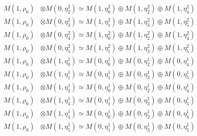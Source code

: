 \begin{align*}
M(1,\rho_{0}) &\otimes M(0,\eta^{2}_{2}) \simeq M(1,\eta^{2}_{0}) \oplus M(1,\eta^{2}_{2}) \oplus M(1,\eta^{2}_{4}) \\
M(1,\rho_{0}) &\otimes M(0,\eta^{2}_{3}) \simeq M(1,\eta^{2}_{1}) \oplus M(1,\eta^{2}_{3}) \oplus M(1,\eta^{2}_{5}) \\
M(1,\rho_{0}) &\otimes M(0,\eta^{2}_{4}) \simeq M(1,\eta^{2}_{0}) \oplus M(1,\eta^{2}_{2}) \oplus M(1,\eta^{2}_{4}) \\
M(1,\rho_{0}) &\otimes M(0,\eta^{2}_{5}) \simeq M(1,\eta^{2}_{1}) \oplus M(1,\eta^{2}_{3}) \oplus M(1,\eta^{2}_{5}) \\
M(1,\rho_{0}) &\otimes M(1,\eta^{1}_{0}) \simeq M(0,\eta^{1}_{0}) \oplus M(0,\eta^{1}_{2}) \oplus M(0,\eta^{1}_{4}) \\
M(1,\rho_{0}) &\otimes M(1,\eta^{1}_{1}) \simeq M(0,\eta^{1}_{1}) \oplus M(0,\eta^{1}_{3}) \oplus M(0,\eta^{1}_{5}) \\
M(1,\rho_{0}) &\otimes M(1,\eta^{1}_{2}) \simeq M(0,\eta^{1}_{0}) \oplus M(0,\eta^{1}_{2}) \oplus M(0,\eta^{1}_{4}) \\
M(1,\rho_{0}) &\otimes M(1,\eta^{1}_{3}) \simeq M(0,\eta^{1}_{1}) \oplus M(0,\eta^{1}_{3}) \oplus M(0,\eta^{1}_{5}) \\
M(1,\rho_{0}) &\otimes M(1,\eta^{1}_{4}) \simeq M(0,\eta^{1}_{0}) \oplus M(0,\eta^{1}_{2}) \oplus M(0,\eta^{1}_{4}) \\
M(1,\rho_{0}) &\otimes M(1,\eta^{1}_{5}) \simeq M(0,\eta^{1}_{1}) \oplus M(0,\eta^{1}_{3}) \oplus M(0,\eta^{1}_{5}) \\
\end{align*}

